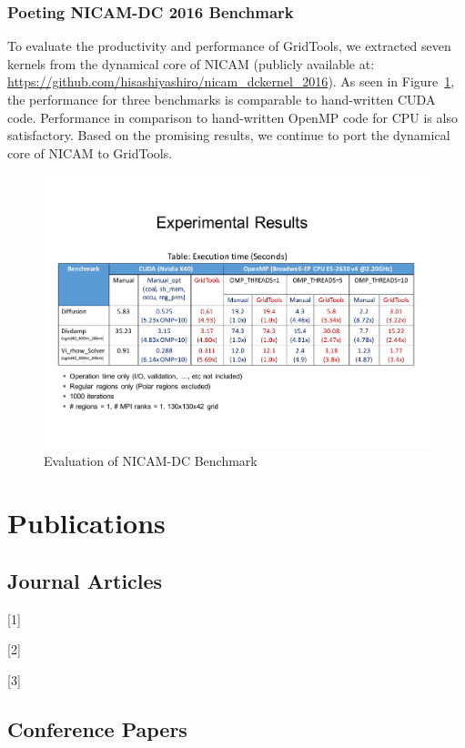 \documentclass{book}
\begin{document}
\subsubsection{Poeting NICAM-DC 2016 Benchmark}
To evaluate the productivity and performance of GridTools, we extracted seven kernels from the dynamical core of NICAM (publicly available at: \url{https://github.com/hisashiyashiro/nicam_dckernel_2016}). As seen in Figure~\ref{fig:5}, the performance for three benchmarks is comparable to hand-written CUDA code. Performance in comparison to hand-written OpenMP code for CPU is also satisfactory. Based on the promising results, we continue to port the dynamical core of NICAM to GridTools.
\begin{figure}[h]
\centering
\includegraphics[width=1.0\textwidth]{figs/nicam01.pdf}%
\caption{Evaluation of NICAM-DC Benchmark}
\label{fig:5}
\end{figure}
\section{Publications}

\subsection{Journal Articles}

[1] 

[2]

[3]

\subsection{Conference Papers}
\end{document}
